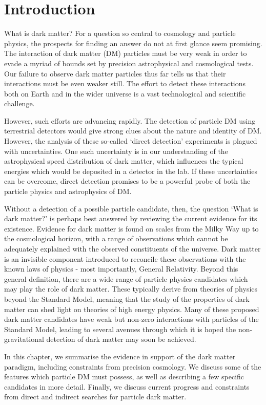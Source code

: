 \chapter{Introduction}
What is dark matter? For a question so central to cosmology and particle physics, the prospects for finding an answer do not at first glance seem promising. The interaction of dark matter (DM) particles must be very weak in order to evade a myriad of bounds set by precision astrophysical and cosmological tests. Our failure to observe dark matter particles thus far tells us that their interactions must be even weaker still. The effort to detect these interactions both on Earth and in the wider universe is a vast technological and scientific challenge.

However, such efforts are advancing rapidly. The detection of particle DM using terrestrial detectors would give strong clues about the nature and identity of DM. However, the analysis of these so-called `direct detection' experiments is plagued with uncertainties. One such uncertainty is in our understanding of the astrophysical speed distribution of dark matter, which influences the typical energies which would be deposited in a detector in the lab. If these uncertainties can be overcome, direct detection promises to be a powerful probe of both the particle physics and astrophysics of DM.

Without a detection of a possible particle candidate, then, the question `What is dark matter?' is perhaps best answered by reviewing the current evidence for its existence. Evidence for dark matter is found on scales from the Milky Way up to the cosmological horizon, with a range of observations which cannot be adequately explained with the observed constituents of the universe. Dark matter is an invisible component introduced to reconcile these observations with the known laws of physics - most importantly, General Relativity. Beyond this general definition, there are a wide range of particle physics candidates which may play the role of dark matter. These typically derive from theories of physics beyond the Standard Model, meaning that the study of the properties of dark matter can shed light on theories of high energy physics. Many of these proposed dark matter candidates have weak but non-zero interactions with particles of the Standard Model, leading to several avenues through which it is hoped the non-gravitational detection of dark matter may soon be achieved.

In this chapter, we summarise the evidence in support of the dark matter paradigm, including constraints from precision cosmology. We discuss some of the features which particle DM must possess, as well as describing a few specific candidates in more detail. Finally, we discuss current progress and constraints from direct and indirect searches for particle dark matter.

